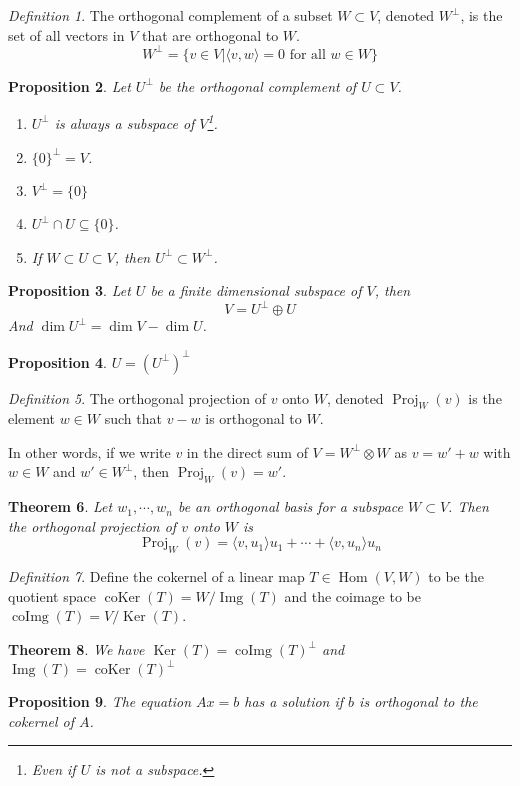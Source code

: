 \documentclass[12pt]{amsart}
\DeclareMathOperator{\coker}{coKer}
\DeclareMathOperator{\coimg}{coImg}
\renewcommand{\ker}{\Ker}
\DeclareMathOperator{\Ker}{Ker}
\DeclareMathOperator{\proj}{Proj}
\DeclareMathOperator{\Hom}{Hom}
\DeclareMathOperator{\img}{Img}
\newtheorem{theorem}{Theorem}[section]
\newtheorem{proposition}[theorem]{Proposition}
\theoremstyle{remark}
\newtheorem{definition}[theorem]{Definition}
\numberwithin{equation}{section}
\begin{document}
	\begin{definition}
		The orthogonal complement of a subset $W\subset V$, denoted $W^\perp$, is the set of all vectors in $V$ that are orthogonal to $W$.
		\[W^{\perp}=\{v\in V |\langle v,w\rangle =0 \text{ for all }w\in W\}\]
	\end{definition}
	
	\begin{proposition}Let $U^\perp$ be the orthogonal complement of $U\subset V$.
	\begin{enumerate}
		\item $U^\perp$ is always a subspace of $V$\footnote{Even if $U$ is not a subspace.}.
		\item $\{0\}^\perp=V$.
		\item $V^\perp=\{0\}$
		\item $U^\perp\cap U\subseteq \{0\}$.
		\item If $W\subset U\subset V$, then $U^\perp\subset W^\perp$.
	\end{enumerate} 
	\end{proposition}
	\begin{proposition}
		Let $U$ be a finite dimensional subspace of $V$, then
		\[V=U^\perp\oplus U\]
		And $\dim U^\perp=\dim V-\dim U$.
	\end{proposition}
	\begin{proposition}
		 $U=(U^\perp)^\perp$
	\end{proposition}
	
	\begin{definition}
			The orthogonal projection of $v$ onto $W$, denoted $\proj_W(v)$ is the element $w\in W$ such that $v-w$ is orthogonal to $W$.
			
			In other words, if we write $v$ in the direct sum of $V=W^\perp \otimes W$ as $v=w'+w$ with $w\in W$ and $w'\in W^\perp$, then $\proj_W(v)=w'$.

		\end{definition}

	\begin{theorem}
		Let $w_1,\cdots,w_n$ be an orthogonal basis for a subspace $W\subset V$. Then the orthogonal projection of $v$ onto $W$ is
		\[\proj_{W}(v)=\langle v,u_1\rangle u_1+\cdots+\langle v,u_n\rangle u_n\]
		
	\end{theorem}
	
	\begin{definition}
		Define the cokernel of a linear map $T\in\Hom(V,W)$ to be the quotient space $\coker(T)=W/\img(T)$ and the coimage to be $\coimg(T)=V/\ker(T)$.
	\end{definition}
	
	\begin{theorem}
		We have $\ker(T)=\coimg(T)^\perp$ and $\img(T)=\coker(T)^\perp$
	\end{theorem}
	
	\begin{proposition}
		The equation $Ax=b$ has a solution if $b$ is orthogonal to the cokernel of $A$.\end{proposition}
	
	
\end{document}

